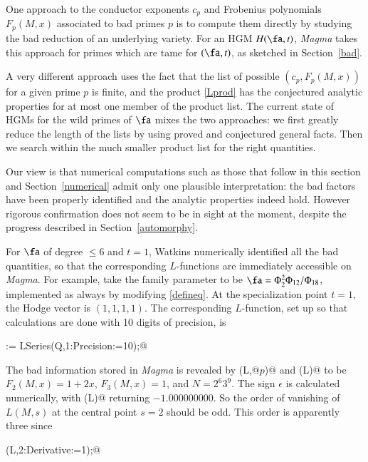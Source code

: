 \documentclass{notices}
\numberwithin{equation}{section}
\numberwithin{table}{section}
\numberwithin{figure}{section}
\begin{document}
{    One approach to the conductor exponents $c_p$ and 
 Frobenius polynomials $F_p(M,x)$ associated to 
 bad primes $p$ is to compute them directly by 
 studying the bad reduction of an
 underlying variety.   For an HGM $H(\fa,t)$, {\em Magma} takes this approach for 
 primes which are tame for $(\fa,t)$, as sketched in Section~\ref{bad}.

    A very different approach  
 uses the fact that the list of possible 
 $(c_p,F_p(M,x))$ for a given prime $p$ is finite, 
and the product \eqref{Lprod} has the conjectured
analytic properties for at most one member 
of the product list.  The current state of HGMs 
for the wild primes of $\fa$ mixes
the two approaches: we first greatly reduce the 
length of the lists by using proved and
conjectured general facts.  Then we 
search within the much smaller product list for 
the right quantities. 

   Our view is that numerical computations such as 
those that follow in this section and Section~\ref{numerical}
admit only one plausible interpretation: the bad factors
have been properly identified and the 
analytic properties indeed hold.   However 
rigorous confirmation does not seem to be
in sight at the moment, despite the progress described
in Section~\ref{automorphy}.    
   
 For $\fa$ of degree $\leq 6$ and $t=1$, 
Watkins numerically identified all the bad quantities, 
so that the corresponding $L$-functions
are immediately accessible on {\em Magma}.
For example, take the family parameter 
to be $\fa=\Phi_2^2 \Phi_{12}/\Phi_{18}$, implemented
as always by modifying \eqref{defineq}.
At the specialization point $t=1$, the
Hodge vector is $(1,1,1,1)$.  The corresponding $L$-function, set up
so that calculations are 
done with 10 digits of precision, is
\smallskip

\verb@L := LSeries(Q,1:Precision:=10);@
\smallskip

\noindent The bad information stored in {\em Magma} is revealed by
\verb@EulerFactor(L,@$p$\verb@)@ and \verb@Conductor(L)@ 
to be $F_2(M,x)=1+2x$, $F_3(M,x)=1$,
and $N = 
2^6 3^9$.   The sign $\epsilon$
is calculated numerically, with \verb@Sign(L)@ 
returning $-1.000000000$.  So the order of vanishing 
of $L(M,s)$ at the central point $s=2$ should be odd.  
This order is apparently three since
\smallskip

\verb@Evaluate(L,2:Derivative:=1);@
\smallskip

}
\end{document}
